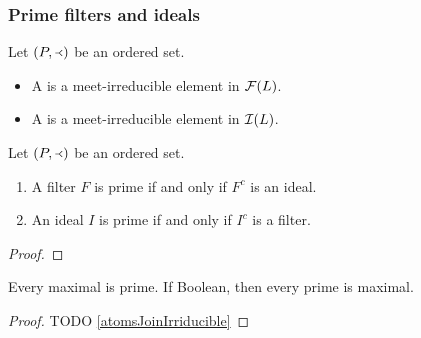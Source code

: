 \subsubsection{Prime filters and ideals}
\begin{definition}
Let $\left( P,\Yleft \right)$ be an ordered set.
\begin{itemize}
\item A  is a meet-irreducible element in $\operatorname{\mathcal{F}}(L)$.
\item A  is a meet-irreducible element in $\operatorname{\mathcal{I}}(L)$.
\end{itemize}
\end{definition}

\begin{proposition}
Let $\left( P,\Yleft \right)$ be an ordered set.
\begin{enumerate}
\item A filter $F$ is prime \textup{if and only if} $F^c$ is an ideal.
\item An ideal $I$ is prime \textup{if and only if} $I^c$ is a filter.
\end{enumerate}
\end{proposition}
\begin{proof}

\end{proof}

\begin{lemma} \label{maximalPrimeFiltersIdeals}
Every maximal is prime. If Boolean, then every prime is maximal.
\end{lemma}
\begin{proof}
TODO \ref{atomsJoinIrriducible}
\end{proof}


